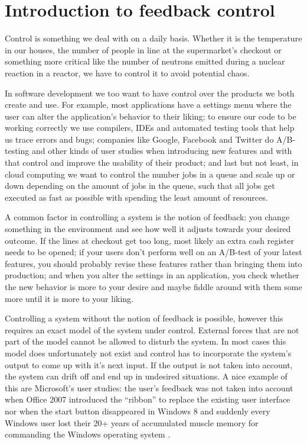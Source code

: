 \chapter{Introduction to feedback control}
Control is something we deal with on a daily basis. Whether it is the temperature in our houses, the number of people in line at the supermarket's checkout or something more critical like the number of neutrons emitted during a nuclear reaction in a reactor, we have to control it to avoid potential chaos.

In software development we too want to have control over the products we both create and use. For example, most applications have a settings menu where the user can alter the application's behavior to their liking; to ensure our code to be working correctly we use compilers, IDEs and automated testing tools that help us trace errors and bugs; companies like Google, Facebook and Twitter do A/B-testing and other kinds of user studies when introducing new features and with that control and improve the usability of their product; and last but not least, in cloud computing we want to control the number jobs in a queue and scale up or down depending on the amount of jobs in the queue, such that all jobs get executed as fast as possible with spending the least amount of resources.

A common factor in controlling a system is the notion of feedback: you change something in the environment and see how well it adjusts towards your desired outcome. If the lines at checkout get too long, most likely an extra cash register needs to be opened; if your users don't perform well on an A/B-test of your latest features, you should probably revise these features rather than bringing them into production; and when you alter the settings in an application, you check whether the new behavior is more to your desire and maybe fiddle around with them some more until it is more to your liking.

Controlling a system without the notion of feedback is possible, however this requires an exact model of the system under control. External forces that are not part of the model cannot be allowed to disturb the system. In most cases this model does unfortunately not exist and control has to incorporate the system's output to come up with it's next input. If the output is not taken into account, the system can drift off and end up in undesired situations. A nice example of this are Microsoft's user studies: the user's feedback was not taken into account when Office 2007 introduced the ``ribbon'' to replace the existing user interface nor when the start button disappeared in Windows 8 and suddenly every Windows user lost their 20+ years of accumulated muscle memory for commanding the Windows operating system \cite{meijer2014-embracing-the-hacker-way}.

